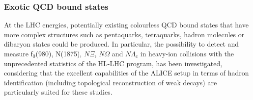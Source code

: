 \subsubsection{Exotic QCD bound states}

At the LHC energies, potentially existing colourless QCD bound states that have more complex structures such as pentaquarks, tetraquarks, hadron molecules or dibaryon states could be produced.
In particular, the possibility to detect and measure f$_{0}$(980), N(1875), $N\Xi$, $N\Omega$ and $N\Lambda_c$ in heavy-ion collisions with the unprecedented statistics of the HL-LHC program, has been investigated, considering that the excellent capabilities of the ALICE setup in terms of hadron identification (including topological reconstruction of weak decays) are particularly suited for these studies.

